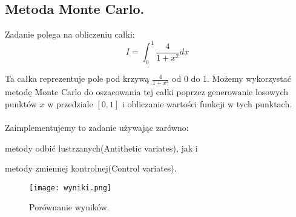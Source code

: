 \documentclass[12pt,letterpaper]{article}
\theoremstyle{definition}
\begin{document}
\subsection{Metoda Monte Carlo.}

Zadanie polega na obliczeniu całki:
$$I=\int_0^1 \frac{4}{1+x^2} dx$$

Ta całka reprezentuje pole pod krzywą $\frac{4}{1+x^2}$ od 0 do 1. Możemy wykorzystać metodę Monte Carlo do oszacowania tej całki poprzez generowanie losowych punktów $x$ w przedziale $[0,1]$ i obliczanie wartości funkcji w tych punktach.\\
\\
Zaimplementujemy to zadanie używając zarówno: 

metody odbić lustrzanych(Antithetic variates), jak i 

metody zmiennej kontrolnej(Control variates).

\begin{figure}[H]
			\centering

				\centering
				\texttt{[image: wyniki.png]}
				\caption{Porównanie wyników.}
				\label{fig:zdjecie1}
			\hfill
		\end{figure}
  
\end{document}
